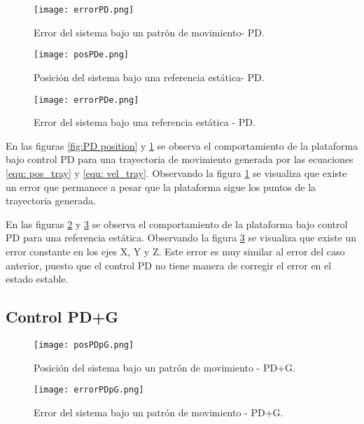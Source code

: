 \begin{figure}[H]
    \centering
    \texttt{[image: errorPD.png]}
    \caption{Error del sistema bajo un patrón de movimiento- PD.}
    \label{fig:PD error}
\end{figure}


\begin{figure}[H]
    \centering
    \texttt{[image: posPDe.png]}
    \caption{Posición del sistema bajo una referencia estática- PD.}
    \label{fig:PD positione}
\end{figure}

\begin{figure}[H]
    \centering
    \texttt{[image: errorPDe.png]}
    \caption{Error del sistema bajo una referencia estática - PD.}
    \label{fig:PD errore}
\end{figure}

En las figuras \ref{fig:PD position} y \ref{fig:PD error} se observa el comportamiento de la plataforma bajo control PD para una trayectoria de movimiento generada por las ecuaciones \ref{equ: pos_tray} y \ref{equ: vel_tray}. Observando la figura \ref{fig:PD error} se visualiza que existe un error que permanece a pesar que la plataforma sigue los puntos de la trayectoria generada.

En las figuras \ref{fig:PD positione} y \ref{fig:PD errore} se observa el comportamiento de la plataforma bajo control PD para una referencia estática. Observando la figura \ref{fig:PD errore}  se visualiza que existe un error constante en los ejes X, Y y Z. Este error es muy similar al error del caso anterior, puesto que el control PD no tiene manera de corregir el error en el estado estable.

\subsection{Control PD+G}

\begin{figure}[H]
    \centering
    \texttt{[image: posPDpG.png]}
    \caption{Posición del sistema bajo un patrón de movimiento - PD+G.}
    \label{fig:PDG position}
\end{figure}

\begin{figure}[H]
    \centering
    \texttt{[image: errorPDpG.png]}
    \caption{Error del sistema bajo un patrón de movimiento - PD+G.}
    \label{fig:PDG error}
\end{figure}

